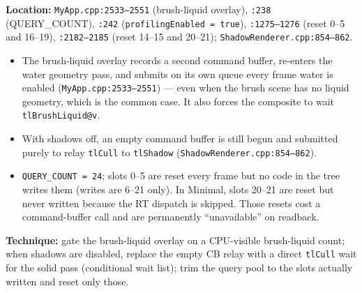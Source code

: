 \documentclass[11pt,a4paper]{article}
\begin{document}
\textbf{Location:} \texttt{MyApp.cpp:2533--2551} (brush-liquid overlay), \texttt{:238} (QUERY\_COUNT), \texttt{:242} (\texttt{profilingEnabled = true}),
\texttt{:1275--1276} (reset 0--5 and 16--19), \texttt{:2182--2185} (reset 14--15 and 20--21); \texttt{ShadowRenderer.cpp:854--862}.

\begin{itemize}
    \item The brush-liquid overlay records a second command buffer, re-enters the water geometry pass, and submits on its own queue every frame water is enabled
    (\texttt{MyApp.cpp:2533--2551}) --- even when the brush scene has no liquid geometry, which is the common case. It also forces the composite to wait
    \texttt{tlBrushLiquid@v}.
    \item With shadows off, an empty command buffer is still begun and submitted purely to relay \texttt{tlCull} to \texttt{tlShadow} (\texttt{ShadowRenderer.cpp:854--862}).
    \item \texttt{QUERY\_COUNT = 24}; slots 0--5 are reset every frame but no code in the tree writes them (writes are 6--21 only). In Minimal, slots 20--21 are reset but never
    written because the RT dispatch is skipped. Those resets cost a command-buffer call and are permanently ``unavailable'' on readback.
\end{itemize}

\textbf{Technique:} gate the brush-liquid overlay on a CPU-visible brush-liquid count; when shadows are disabled, replace the empty CB relay with a direct \texttt{tlCull} wait
for the solid pass (conditional wait list); trim the query pool to the slots actually written and reset only those.
\end{document}
